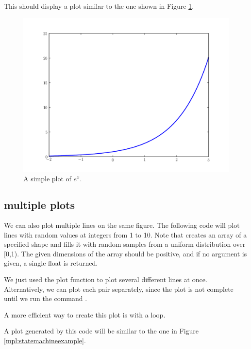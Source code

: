 This should display a plot similar to the one shown in Figure
\ref{mpl:explot}.

\begin{figure}
\includegraphics[width=\textwidth]{explot.pdf}
\caption{A simple plot of $e^x$.} 
\label{mpl:explot} 
\end{figure}

\subsection*{multiple plots}
We can also plot multiple lines on the same figure. 
The following code will plot lines with random values at integers from 1 to 10. 
Note that  creates an array of a specified shape and fills it with random samples from a uniform distribution over [0,1). The given dimensions of the array should be positive, and if no argument is given, a single float is returned. 



We just used the plot function to plot several different lines at once. Alternatively, we can plot each  pair separately, since the plot is not complete until we run the command .



A more efficient way to create this plot is with a loop.



A plot generated by this code will be similar to the one
in Figure \ref{mpl:statemachineexample}.

